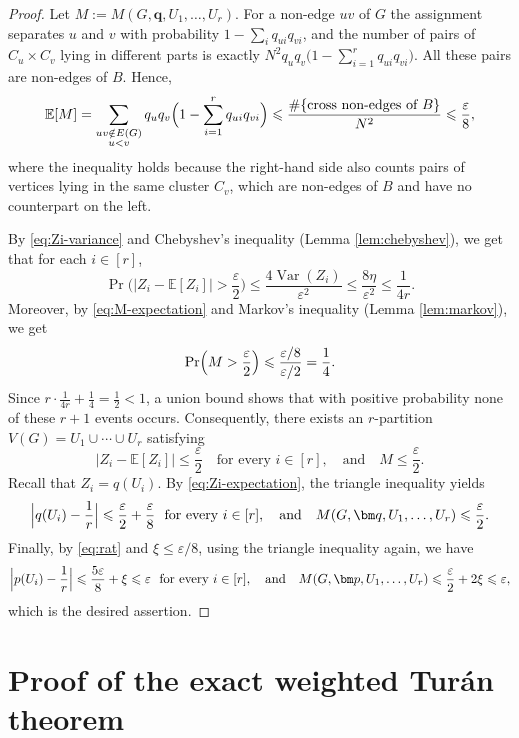 \documentclass[11pt, a4paper]{article}
\theoremstyle{definition}
\theoremstyle{plain}
\renewcommand{\le}{\leqslant}
\newcommand{\EE}{\mathbb{E}}
\newcommand{\Var}{\operatorname{Var}}
\begin{document}
\begin{proof}
Let $M:=M(G,\bm q, U_1,\ldots,U_r)$. For a
non-edge $uv$ of $G$ the assignment separates $u$ and
$v$ with probability $1-\sum_{i}q_{ui}q_{vi}$, and the
number of pairs of $C_u\times C_v$ lying in different
parts is exactly
$N^2q_uq_v\bigl(1-\sum_{i=1}^r q_{ui}q_{vi}\bigr)$. 
 All these pairs are non-edges of $B$. Hence,
\begin{equation}\label{eq:M-expectation}
  \EE[M]=\sum_{\substack{uv\notin E(G)\\u<v}}
  q_uq_v\Bigl(1-\sum_{i=1}^rq_{ui}q_{vi}\Bigr)
  \le\frac{\#\{\text{cross non-edges of }B\}}{N^2}
  \le\frac{\varepsilon}{8},
\end{equation}
where the inequality holds because the right-hand side also counts pairs of vertices lying in the same cluster $C_v$, which are non-edges of $B$ and have no counterpart on the left. 

By \eqref{eq:Zi-variance} and Chebyshev's inequality (Lemma \ref{lem:chebyshev}), we get that for each $i\in[r]$, 
\[
  \Pr \bigg( \bigl\lvert Z_i-\EE[Z_i]\bigr\rvert
  >\frac{\varepsilon}{2}  \bigg)
  \le\frac{4\Var(Z_i)}{\varepsilon^2}
  \le\frac{8\eta}{\varepsilon^2} \le  \frac{1}{4r}.
\]
Moreover, by \eqref{eq:M-expectation} and Markov's inequality (Lemma \ref{lem:markov}), we get 
$$\Pr\Bigl(M>\frac{\varepsilon}{2}\Bigr)
\le\frac{\varepsilon/8}{\varepsilon/2}=\frac14.$$
Since $r\cdot\frac{1}{4r}+\frac14=\frac12<1$, a union
bound shows that with positive probability none of
these $r+1$ events occurs. Consequently, 
there exists an $r$-partition $V(G)=U_1\cup \cdots \cup U_r$ satisfying 
\[   \Big| Z_i - \mathbb{E}[Z_i]\Big| \le \frac{\varepsilon}{2} \quad 
\text{for every $i\in [r]$}, \quad \text{and} \quad M \le \frac{\varepsilon}{2}.  \]
Recall that $Z_i=q(U_i)$.  By \eqref{eq:Zi-expectation}, the triangle inequality yields 
\[
  \Bigl\lvert q(U_i)-\frac1r\Bigr\rvert
  \le\frac{\varepsilon}{2}+\frac{\varepsilon}{8}
  ~~ \text{for every}~i\in[r],
  \quad \text{and} \quad 
  M(G,\bm q, U_1,\ldots,U_r)\le\frac{\varepsilon}{2}.
\]
Finally, by \eqref{eq:rat} and $\xi\le\varepsilon/8$, using the triangle inequality again, we have 
\[
  \Bigl\lvert p(U_i)-\frac1r\Bigr\rvert
  \le\frac{5\varepsilon}{8}+\xi\le\varepsilon ~~
  \text{for every}~i\in[r], 
  \quad \text{and} \quad 
  M(G,\bm p, U_1,\ldots,U_r)
  \le\frac{\varepsilon}{2}+2\xi\le\varepsilon,
\]
which is the desired assertion.
\end{proof}





\section{Proof of the exact weighted Tur\'{a}n theorem}
\end{document}
